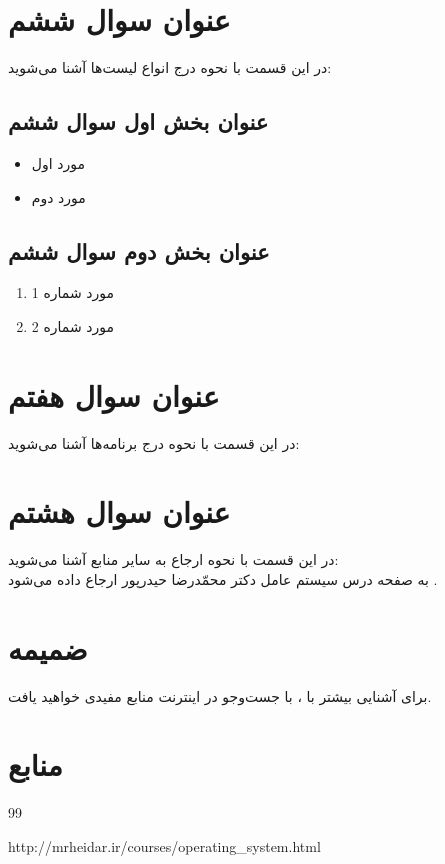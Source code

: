 \documentclass{article}
\begin{document}
\section{عنوان سوال ششم}
در این قسمت با نحوه درج انواع لیست‌ها آشنا می‌شوید:
\subsection{عنوان بخش اول سوال ششم}
\begin{itemize}
    \item [$\bullet$] مورد اول
    \item [$\bullet$] مورد دوم
\end{itemize}
\subsection{عنوان بخش دوم سوال ششم}
\begin{enumerate}
    \item مورد شماره 1
    \item مورد شماره 2
\end{enumerate}

\section{عنوان سوال هفتم}
در این قسمت با نحوه درج برنامه‌ها آشنا می‌شوید:
\lr{}

\section{عنوان سوال هشتم}
در این قسمت با نحوه ارجاع به سایر منابع آشنا می‌شوید:\\
\indent
به صفحه درس سیستم عامل دکتر محمّدرضا حیدرپور ارجاع داده می‌شود .

\section{ضمیمه}
برای آشنایی بیشتر با \lr{\LaTeX}، با جست‌و‌جو در اینترنت منابع مفیدی خواهید یافت.


\section*{منابع}
\renewcommand{\section}[2]{}%
\begin{thebibliography}{99} %


\begin{LTRitems}

\resetlatinfont

 http://mrheidar.ir/courses/operating\_system.html
\end{LTRitems}

\end{thebibliography}
\end{document}
